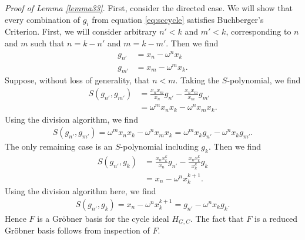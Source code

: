 \documentclass{amsart}
\renewcommand{\(}{\left(}
\renewcommand{\)}{\right)}
\newcommand{\<}{\langle}
\renewcommand{\>}{\rangle}
\newcommand{\aln}[1]{\begin{align*} #1 \end{align*}} %
\theoremstyle{definition}
\theoremstyle{remark}
\begin{document}
\emph{Proof of Lemma \ref{lemma33}}. First, consider the directed case. We will show that every combination of $g_i$ from equation \eqref{eq:sccycle} satisfies Buchberger's Criterion. First, we will consider arbitrary $n' < k$ and $m' < k$, corresponding to $n$ and $m$ such that $n = k - n'$ and $m = k - m'$. Then we find
\aln{
  g_{n'} &= x_n - \omega^n x_k\\
  g_{m'} &= x_m - \omega^m x_k.
}
Suppose, without loss of generality, that $n < m$. Taking the $S$-polynomial, we find
\aln{
  S(g_{n'}, g_{m'}) &= \frac{x_n x_m}{x_n} g_{n'} - \frac{x_n x_m}{x_m} g_{m'}\\
  &= \omega^m x_n x_k - \omega^n x_m x_k.
}
Using the division algorithm, we find
\aln{
  S(g_{n'}, g_{m'}) = \omega^m x_n x_k - \omega^n x_m x_k = \omega^m x_k g_{n'} - \omega^n x_k g_{m'}.
}
The only remaining case is an $S$-polynomial including $g_k$. Then we find
\aln{
  S(g_{n'}, g_k) &= \frac{x_n x_k^k}{x_n} g_{n'} - \frac{x_n x_k^k}{x_k^k} g_k\\
  &= x_n - \omega^n x_k^{k+1}.
}
Using the division algorithm here, we find
\aln{
  S(g_{n'}, g_k) = x_n - \omega^n x_k^{k+1} = g_{n'} - \omega^n x_k g_k.
}
Hence $F$ is a Gr\"obner basis for the cycle ideal $H_{G,C}$. The fact that $F$ is a reduced Gr\"obner basis follows from inspection of $F$.
\end{document}
